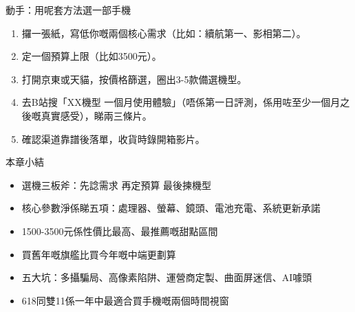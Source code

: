 \begin{tcbpractice}{動手：用呢套方法選一部手機}
\begin{enumerate}
  \item 攞一張紙，寫低你嘅兩個核心需求（比如：續航第一、影相第二）。
  \item 定一個預算上限（比如3500元）。
  \item 打開京東或天貓，按價格篩選，圈出3-5款備選機型。
  \item 去B站搜「XX機型 一個月使用體驗」（唔係第一日評測，係用咗至少一個月之後嘅真實感受），睇兩三條片。
  \item 確認渠道靠譜後落單，收貨時錄開箱影片。
\end{enumerate}

\end{tcbpractice}

\begin{tcbsummary}{本章小結}
\begin{itemize}
  \item 選機三板斧：先諗需求 再定預算 最後揀機型
  \item 核心參數淨係睇五項：處理器、螢幕、鏡頭、電池充電、系統更新承諾
  \item 1500-3500元係性價比最高、最推薦嘅甜點區間
  \item 買舊年嘅旗艦比買今年嘅中端更劃算
  \item 五大坑：多攝騙局、高像素陷阱、運營商定製、曲面屏迷信、AI噱頭
  \item 618同雙11係一年中最適合買手機嘅兩個時間視窗
\end{itemize}

\end{tcbsummary}
